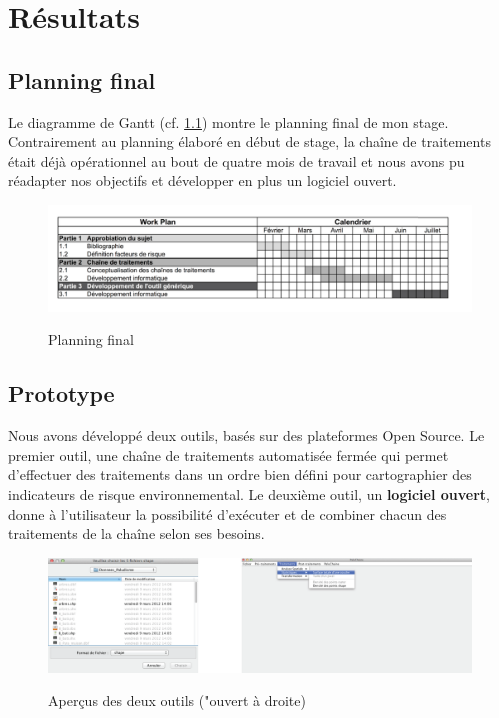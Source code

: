 \chapter{Résultats} \label{Resultats}

\section{Planning final }

Le diagramme de Gantt (cf. \ref{GanttFinal}) montre le planning final de mon stage. Contrairement au planning élaboré en début de stage, la chaîne de traitements était déjà opérationnel au bout de quatre mois de travail et nous avons pu réadapter nos objectifs et développer en plus un logiciel ouvert.

\begin{center}
\begin{figure}[h] \centering
\includegraphics[width=14cm]{GanttFinal}\\
\caption{\label{GanttFinal} Planning final }
\end{figure}
\end{center}

\section{Prototype }

Nous avons développé deux outils, basés sur des plateformes Open Source. Le premier outil, une chaîne de traitements automatisée fermée qui permet d'effectuer des traitements dans un ordre bien défini pour cartographier des indicateurs de risque environnemental. Le deuxième outil, un \textbf{logiciel ouvert}, donne à l'utilisateur la possibilité d'exécuter et de combiner chacun des traitements de la chaîne selon  ses besoins. 

\begin{center}
\begin{figure}[h] \centering
\includegraphics[width=14cm]{Results}\\
\caption{\label{Results} Aperçus des deux outils ("ouvert à droite) }
\end{figure}
\end{center}

